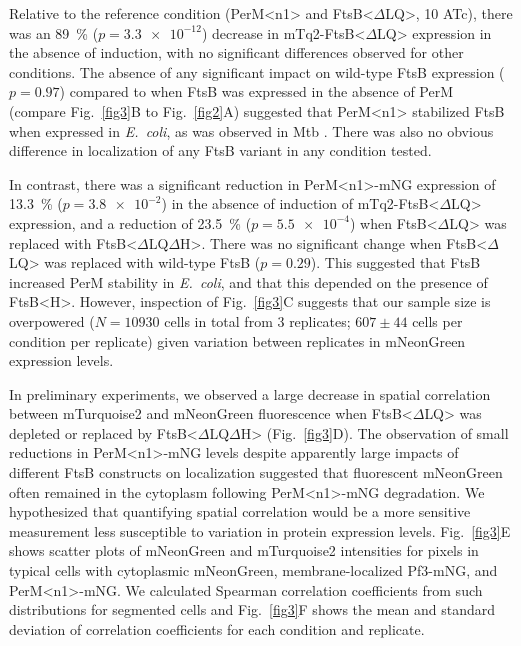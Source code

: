 \documentclass[twocolumn,pdflatex,sn-nature]{sn-jnl}%
\def\textsuperscript#1{<#1>}%
\newcommand\ec{\textit{E.~coli}}
\newcommand\mtb{Mtb}
\newcommand\ftsbH{FtsB\textsuperscript{H}}
\newcommand\ftsbdLQ{FtsB\textsuperscript{$\Delta{}$LQ}}
\newcommand\ftsbdLQdH{FtsB\textsuperscript{$\Delta{}$LQ$\Delta{}$H}}
\newcommand\permN{PerM\textsuperscript{n1}}
\begin{document}
Relative to the reference condition (\permN{} and \ftsbdLQ{}, \qty{10}{\nM} ATc), there was an \qty{89}{\percent} ($p=\num{3.3e-12}$) decrease in mTq2-\ftsbdLQ{} expression in the absence of induction, with no significant differences observed for other conditions.
The absence of any significant impact on wild-type FtsB expression ($p=0.97$) compared to when FtsB was expressed in the absence of PerM (compare Fig.~\ref{fig3}B to Fig.~\ref{fig2}A) suggested that \permN{} stabilized FtsB when expressed in \ec{}, as was observed in \mtb{} \citep{wangPersistentMycobacteriumTuberculosis2019}.
There was also no obvious difference in localization of any FtsB variant in any condition tested.

In contrast, there was a significant reduction in \permN{}-mNG expression of \qty{13.3}{\percent} ($p=\num{3.8e-2}$) in the absence of induction of mTq2-\ftsbdLQ{} expression, and a reduction of \qty{23.5}{\percent} ($p=\num{5.5e-4}$) when \ftsbdLQ{} was replaced with \ftsbdLQdH{}.
There was no significant change when \ftsbdLQ{} was replaced with wild-type FtsB ($p=0.29$). This suggested that FtsB increased PerM stability in \ec{}, and that this depended on the presence of \ftsbH{}.
However, inspection of Fig.~\ref{fig3}C suggests that our sample size is overpowered ($N=\num{10930}$ cells in total from 3 replicates; $607 \pm 44$ cells per condition per replicate) given variation between replicates in mNeonGreen expression levels. 

In preliminary experiments, we observed a large decrease in spatial correlation between mTurquoise2 and mNeonGreen fluorescence when \ftsbdLQ{} was depleted or replaced by \ftsbdLQdH{} (Fig.~\ref{fig3}D).
The observation of small reductions in \permN{}-mNG levels despite apparently large impacts of different FtsB constructs on localization suggested that fluorescent mNeonGreen often remained in the cytoplasm following \permN{}-mNG degradation.
We hypothesized that quantifying spatial correlation would be a more sensitive measurement less susceptible to variation in protein expression levels.
Fig.~\ref{fig3}E shows scatter plots of mNeonGreen and mTurquoise2 intensities for pixels in typical cells with cytoplasmic mNeonGreen, membrane-localized Pf3-mNG, and \permN{}-mNG.
We calculated Spearman correlation coefficients from such distributions for segmented cells and Fig.~\ref{fig3}F shows the mean and standard deviation of correlation coefficients for each condition and replicate.
\end{document}
